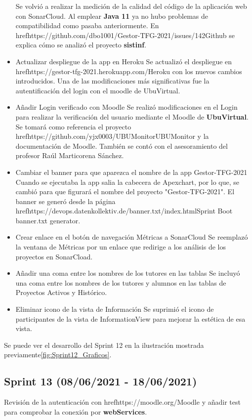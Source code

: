 \begin{itemize}
		Se volvió a realizar la medición de la calidad del código de la aplicación web con SonarCloud. Al emplear \textbf{Java 11} ya no hubo problemas de compatibilidad como pasaba anteriormente. En href{https://github.com/dbo1001/Gestor-TFG-2021/issues/142}{Github} se explica cómo se analizó el proyecto \textbf{sistinf}.
	\item Actualizar despliegue de la app en Heroku
		Se actualizó el despliegue en href{https://gestor-tfg-2021.herokuapp.com/}{Heroku} con los nuevos cambios introducidos. Una de las modificaciones más significativas fue la autentificación del login con el moodle de UbuVirtual.
	\item Añadir Login verificado con Moodle
		Se realizó modificaciones en el Login para realizar la verificación del usuario mediante el Moodle de \textbf{UbuVirtual}. Se tomará como referencia el proyecto href{https://github.com/yjx0003/UBUMonitor}{UBUMonitor} y la documentación de Moodle. También se contó con el asesoramiento del profesor Raúl Marticorena Sánchez.
	\item Cambiar el banner para que aparezca el nombre de la app Gestor-TFG-2021
		Cuando se ejecutaba la app salia la cabecera de Apexchart, por lo que, se cambió para que figurará el nombre del proyecto "Gestor-TFG-2021". El banner se generó desde la página href{https://devops.datenkollektiv.de/banner.txt/index.html}{Sprint Boot banner.txt generator}.
	\item Crear enlace en el botón de navegación Métricas a SonarCloud
		Se reemplazó la ventana de Métricas por un enlace que redirige a los análisis de los proyectos en SonarCload.
	\item Añadir una coma entre los nombres de los tutores en las tablas
		Se incluyó una coma entre los nombres de los tutores y alumnos en las tablas de Proyectos Activos y Histórico.
	\item Eliminar icono de la vista de Información
		Se suprimió el icono de participantes de la vista de InformationView para mejorar la estética de esa vista.
	
\end{itemize}

Se puede ver el desarrollo del Sprint 12 en la ilustración mostrada previamente\ref{fig:Sprint12_Graficos}.



\subsection{Sprint 13 (08/06/2021 - 18/06/2021)}
Revisión de la autenticación con href{https://moodle.org/}{Moodle} y añadir test para comprobar la conexión por \textbf{webServices}.

